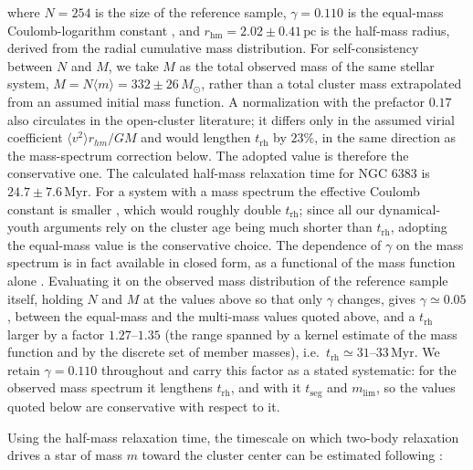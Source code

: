 \documentclass{aa}
\begin{document}
where $N=254$ is the size of the reference sample, $\gamma = 0.110$ is the equal-mass Coulomb-logarithm constant \citep[not to be confused with the \textsc{HDBSCAN} density level $\lambda$ of Sect.~\ref{subsubsec:membership};][]{1994MNRAS.268..257G}, and $r_\mathrm{hm} = 2.02 \pm 0.41\,\mathrm{pc}$ is the half-mass radius, derived from the radial cumulative mass distribution. For self-consistency between $N$ and $M$, we take $M$ as the total observed mass of the same stellar system, $M = N\langle m \rangle = 332 \pm 26\,M_\odot$, rather than a total cluster mass extrapolated from an assumed initial mass function. A normalization with the prefactor $0.17$ also circulates in the open-cluster literature; it differs only in the assumed virial coefficient $\langle v^2\rangle r_{hm}/GM$ \citep[the value $0.4$ adopted here follows][]{1971ApJ...164..399S} and would lengthen $t_{\mathrm{rh}}$ by $23\%$, in the same direction as the mass-spectrum correction below. The adopted value is therefore the conservative one. The calculated half-mass relaxation time for NGC 6383 is $24.7\pm 7.6\,\mathrm{Myr}$. For a system with a mass spectrum the effective Coulomb constant is smaller \citep[$\gamma\simeq0.02$;][]{1996MNRAS.279.1037G}, which would roughly double $t_{\mathrm{rh}}$; since all our dynamical-youth arguments rely on the cluster age being much shorter than $t_{\mathrm{rh}}$, adopting the equal-mass value is the conservative choice. The dependence of $\gamma$ on the mass spectrum is in fact available in closed form, as a functional of the mass function alone \citep[his Eqs.~11 and 26]{1975IAUS...69..133H}. Evaluating it on the observed mass distribution of the reference sample itself, holding $N$ and $M$ at the values above so that only $\gamma$ changes, gives $\gamma\simeq0.05$, between the equal-mass and the multi-mass values quoted above, and a $t_{\mathrm{rh}}$ larger by a factor $1.27$--$1.35$ (the range spanned by a kernel estimate of the mass function and by the discrete set of member masses), i.e.\ $t_{\mathrm{rh}}\simeq31$--$33\,\mathrm{Myr}$. We retain $\gamma=0.110$ throughout and carry this factor as a stated systematic: for the observed mass spectrum it lengthens $t_{\mathrm{rh}}$, and with it $t_{\mathrm{seg}}$ and $m_{\mathrm{lim}}$, so the values quoted below are conservative with respect to it.

Using the half-mass relaxation time, the timescale on which two-body relaxation drives a star of mass $m$ toward the cluster center can be estimated following \citet{1969ApJ...158L.139S}:
\end{document}
